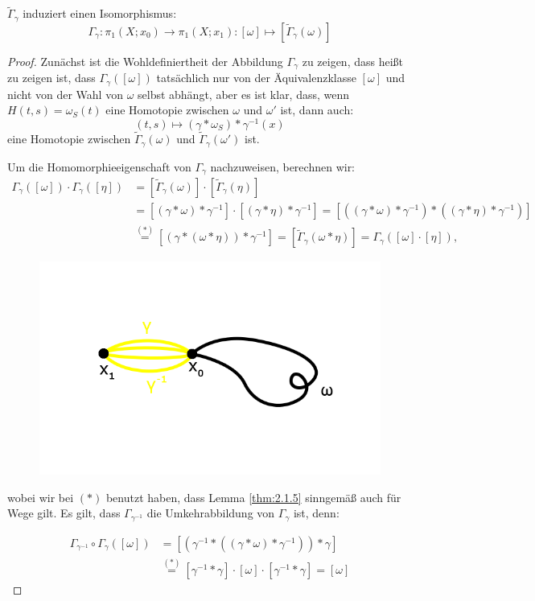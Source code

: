 \documentclass[a4paper,10pt]{scrartcl}
\begin{document}
\begin{st}
 $\tilde \Gamma_\gamma$ induziert einen Isomorphismus:
\[
 \Gamma_\gamma: \pi_1(X;x_0)\to \pi_1(X;x_1): [\omega] \mapsto [\tilde \Gamma_{\gamma}(\omega)]
\]
\end{st}
\begin{proof}
 Zunächst ist die Wohldefiniertheit der Abbildung $\Gamma_\gamma$ zu zeigen, dass heißt zu zeigen ist, dass $\Gamma_{\gamma} ([\omega])$ tatsächlich nur von der Äquivalenzklasse $[\omega]$ und nicht von der Wahl von $\omega$ selbst abhängt, aber es ist klar, dass, wenn $H(t,s)=\omega_S(t)$ eine Homotopie zwischen $\omega$ und $\omega'$ ist, dann auch:
\[
 (t,s)\mapsto (\gamma*\omega_S)*\gamma^{-1}(x)
\]
eine Homotopie zwischen $\tilde \Gamma_{\gamma}(\omega)$ und $\tilde \Gamma_{\gamma}(\omega')$ ist. 

Um die Homomorphieeigenschaft von $\Gamma_{\gamma}$ nachzuweisen, berechnen wir: 
\begin{align*}
 \Gamma_{\gamma}([\omega])\cdot \Gamma_{\gamma} ([\eta])&=[\tilde \Gamma_{\gamma}(\omega)]\cdot [ \tilde \Gamma_{\gamma}(\eta)]\\
&=[(\gamma*\omega)*\gamma^{-1}]\cdot [(\gamma*\eta)*\gamma^{-1}]=[((\gamma*\omega)*\gamma^{-1})*((\gamma*\eta)*\gamma^{-1})]\\
&\stackrel{(*)}=[(\gamma*(\omega*\eta))*\gamma^{-1}]=[\tilde \Gamma_\gamma (\omega*\eta)]=\Gamma_\gamma([\omega] \cdot [\eta]),
\end{align*}

\begin{figure}[ht]
\centering
\includegraphics[scale=0.3]{fig67.png}
\caption{}
\end{figure}

wobei wir bei $(*)$ benutzt haben, dass Lemma \ref{thm:2.1.5} sinngemäß auch für Wege gilt. Es gilt, dass $\Gamma_{\gamma^{-1}}$ die Umkehrabbildung von $\Gamma_\gamma$ ist, denn:

\begin{align*}
 \Gamma_{\gamma^{-1}}\circ \Gamma_\gamma ([\omega])&=[(\gamma^{-1}*((\gamma*\omega)*\gamma^{-1}))*\gamma]\\
 &\stackrel{(*)}=[\gamma^{-1}*\gamma]\cdot [\omega]\cdot [\gamma^{-1} * \gamma]=[\omega]
\end{align*}
\end{proof}
\end{document}
